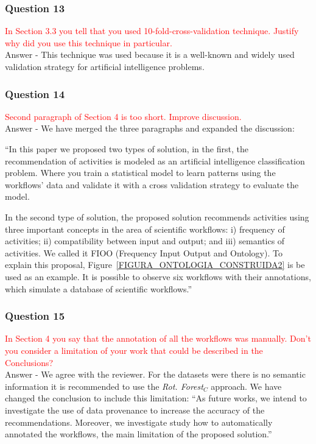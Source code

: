 \documentclass{report}
\begin{document}
\subsubsection{Question 13}
\textcolor{red}{In Section 3.3 you tell that you used 10-fold-cross-validation technique.
	Justify why did you use this technique in particular.
}
\\
Answer -  This technique was used because it is a well-known and widely used validation strategy for artificial intelligence problems.

\subsubsection{Question 14}
\textcolor{red}{Second paragraph of Section 4 is too short. Improve discussion.}
\\
Answer - We have merged the three paragraphs and expanded the discussion:

``In this paper we proposed two types of solution, in the first, the recommendation of activities is modeled as an artificial intelligence classification problem. Where you train a statistical model to learn patterns using the workflows' data and validate it with a cross validation strategy to evaluate the  model.

In the second type of solution, the proposed solution recommends activities using three important concepts in the area of scientific workflows: i) frequency of activities; ii) compatibility between input and output; and iii) semantics of activities. We called it FIOO (Frequency Input Output and Ontology). To explain this proposal, Figure~\ref{FIGURA_ONTOLOGIA_CONSTRUIDA2} is be used as an example. It is possible to observe six workflows with their annotations, which simulate a database of scientific workflows.''

\subsubsection{Question 15}
\textcolor{red}{In Section 4 you say that the annotation of all the workflows was	manually. Don't you consider a limitation of your work that could be described in the Conclusions?}
\\
Answer - We agree with the reviewer. For the datasets were there is no semantic information it is recommended to use the \emph{Rot. Forest\(_C\)} approach.
We have changed the conclusion to include this limitation: 
``As future works, we intend to investigate the use  of  data provenance to increase the accuracy of the recommendations. 
Moreover, we investigate study how to automatically annotated the workflows, the main limitation of the proposed solution.''
\end{document}
